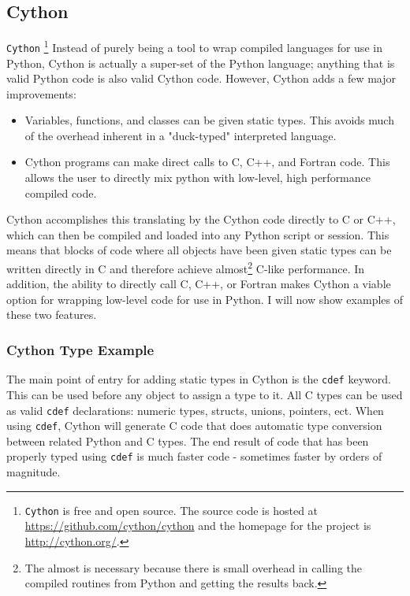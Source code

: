 \subsection{Cython} \label{sub:cython}

  \texttt{Cython} \footnote{\texttt{Cython} is free and open source. The source code is hosted at \url{https://github.com/cython/cython} and the homepage for the project is \url{http://cython.org/}. } Instead of purely being a tool to wrap compiled languages for use in Python, Cython is actually a super-set of the Python language; anything that is valid Python code is also valid Cython code. However, Cython adds a few major improvements:

  \begin{itemize}
    \item Variables, functions, and classes can be given static types. This avoids much of the overhead inherent in a "duck-typed" interpreted language.
    \item Cython programs can make direct calls to C, C++, and Fortran code. This allows the user to directly mix python with low-level, high performance compiled code.
  \end{itemize}

  \mainstretch{}
  Cython accomplishes this translating by the Cython code directly to C or C++, which can then be compiled and loaded into any Python script or session. This means that blocks of code where all objects have been given static types can be written directly in C and therefore achieve almost\footnote{The almost is necessary because there is small overhead in calling the compiled routines from Python and getting the results back.} C-like performance. In addition, the ability to directly call C, C++, or Fortran makes Cython a viable option for wrapping low-level code for use in Python. I will now show examples of these two features.

  \subsubsection{Cython Type Example} \label{ssub:cython_type_example}


    The main point of entry for adding static types in Cython is the \texttt{cdef} keyword. This can be used before any object to assign a type to it. All C types can be used as valid \texttt{cdef} declarations: numeric types, structs, unions, pointers, ect. When using \texttt{cdef}, Cython will generate C code that does automatic type conversion between related Python and C types. The end result of code that has been properly typed using \texttt{cdef} is much faster code - sometimes faster by orders of magnitude.

